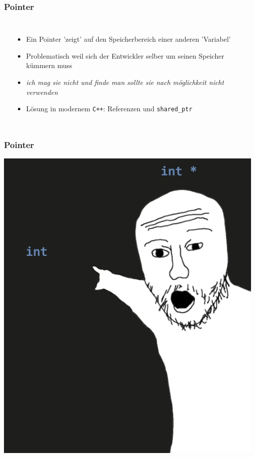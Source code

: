 \documentclass[plain]{beamer}
\newcommand{\cpp}{\texttt{C++}}
\begin{document}
\begin{frame}[fragile]
  \frametitle{Pointer}
  \begin{columns}
    \inputminted[firstline=0, lastline=17]{cpp}{code/examples/pointer.cpp}
    \begin{itemize}
      \item Ein Pointer 'zeigt' auf den Speicherbereich einer anderen 'Variabel'
      \item Problematisch weil sich der Entwickler selber um seinen Speicher kümmern muss
      \item \textit{ich mag sie nicht und finde man sollte sie nach möglichkeit nicht verwenden}
      \item Lösung in modernem \cpp{}: Referenzen und \texttt{shared\_ptr}
    \end{itemize}
  \end{columns}
\end{frame}

\begin{frame}
  \frametitle{Pointer}
  \center \includegraphics[height=0.8\textheight]{imgs/pointer_meme.png}
\end{frame}
\end{document}
